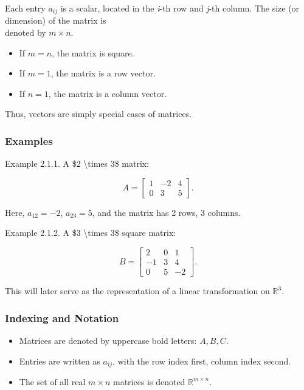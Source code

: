 \documentclass[
  12pt,
  a4paper,
]{article}
\begin{document}
Each entry \(a_{ij}\) is a scalar, located in the \emph{i}-th row and
\emph{j}-th column. The size (or dimension) of the matrix is\\
denoted by \(m \times n\).

\begin{itemize}
\item
  If \(m = n\), the matrix is square.
\item
  If \(m = 1\), the matrix is a row vector.
\item
  If \(n = 1\), the matrix is a column vector.
\end{itemize}

Thus, vectors are simply special cases of matrices.

\subsubsection{Examples}\label{examples}

Example 2.1.1. A \$2 \textbackslash times 3\$ matrix:

\[A = \begin{bmatrix}
1 & -2 & 4 \\
0 & 3 & 5
\end{bmatrix}.\]

Here, \(a_{12} = -2\), \(a_{23} = 5\), and the matrix has 2 rows, 3
columns.

Example 2.1.2. A \$3 \textbackslash times 3\$ square matrix:

\[B = \begin{bmatrix}
2 & 0 & 1 \\
-1 & 3 & 4 \\
0 & 5 & -2
\end{bmatrix}.\]

This will later serve as the representation of a linear transformation
on \(\mathbb{R}^3\).

\subsubsection{Indexing and Notation}\label{indexing-and-notation}

\begin{itemize}
\item
  Matrices are denoted by uppercase bold letters: \(A, B, C\).
\item
  Entries are written as \(a_{ij}\), with the row index first, column
  index second.
\item
  The set of all real \(m \times n\) matrices is denoted
  \(\mathbb{R}^{m \times n}\).
\end{itemize}
\end{document}
